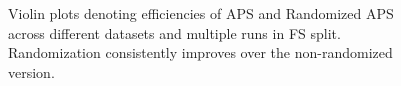 \begin{figure}
\begin{subfigure}{0.6\linewidth}
    \end{subfigure}
    \caption{Violin plots denoting efficiencies of APS and Randomized APS across different datasets and multiple runs in FS split. Randomization consistently improves over the non-randomized version.}
    \label{fig:fs:conformal:aps_vs_randomized}
\end{figure}

